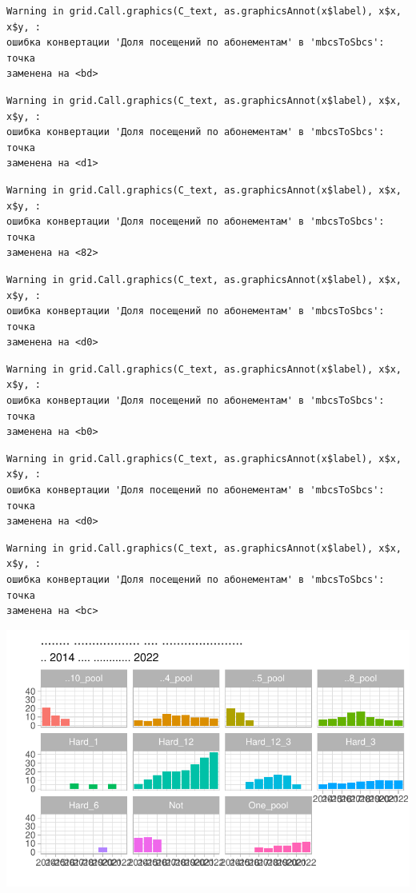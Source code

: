 \documentclass[
  letterpaper,
  DIV=11,
  numbers=noendperiod]{scrreprt}
\begin{document}
\begin{verbatim}
Warning in grid.Call.graphics(C_text, as.graphicsAnnot(x$label), x$x, x$y, :
ошибка конвертации 'Доля посещений по абонементам' в 'mbcsToSbcs': точка
заменена на <bd>
\end{verbatim}

\begin{verbatim}
Warning in grid.Call.graphics(C_text, as.graphicsAnnot(x$label), x$x, x$y, :
ошибка конвертации 'Доля посещений по абонементам' в 'mbcsToSbcs': точка
заменена на <d1>
\end{verbatim}

\begin{verbatim}
Warning in grid.Call.graphics(C_text, as.graphicsAnnot(x$label), x$x, x$y, :
ошибка конвертации 'Доля посещений по абонементам' в 'mbcsToSbcs': точка
заменена на <82>
\end{verbatim}

\begin{verbatim}
Warning in grid.Call.graphics(C_text, as.graphicsAnnot(x$label), x$x, x$y, :
ошибка конвертации 'Доля посещений по абонементам' в 'mbcsToSbcs': точка
заменена на <d0>
\end{verbatim}

\begin{verbatim}
Warning in grid.Call.graphics(C_text, as.graphicsAnnot(x$label), x$x, x$y, :
ошибка конвертации 'Доля посещений по абонементам' в 'mbcsToSbcs': точка
заменена на <b0>
\end{verbatim}

\begin{verbatim}
Warning in grid.Call.graphics(C_text, as.graphicsAnnot(x$label), x$x, x$y, :
ошибка конвертации 'Доля посещений по абонементам' в 'mbcsToSbcs': точка
заменена на <d0>
\end{verbatim}

\begin{verbatim}
Warning in grid.Call.graphics(C_text, as.graphicsAnnot(x$label), x$x, x$y, :
ошибка конвертации 'Доля посещений по абонементам' в 'mbcsToSbcs': точка
заменена на <bc>
\end{verbatim}

\includegraphics{./intro_files/figure-pdf/unnamed-chunk-8-1.pdf}
\end{document}
